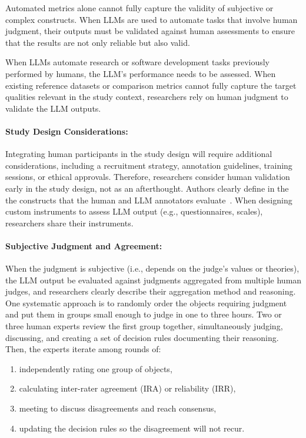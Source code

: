 
Automated metrics alone cannot fully capture the validity of subjective or complex constructs.
When LLMs are used to automate tasks that involve human judgment, their outputs must be validated against human assessments to ensure that the results are not only reliable but also valid.


When LLMs automate research or software development tasks previously performed by humans, the LLM's performance needs to be assessed. When existing reference datasets or comparison metrics cannot fully capture the target qualities relevant in the study context, researchers \should rely on human judgment to validate the LLM outputs.

\paragraph{Study Design Considerations:}
Integrating human participants in the study design will require additional considerations, including a recruitment strategy, annotation guidelines, training sessions, or ethical approvals.
Therefore, researchers \should consider human validation early in the study design, not as an afterthought.
Authors \must clearly define in the \paper the constructs that the human and LLM annotators evaluate~\cite{DBLP:conf/ease/RalphT18}.
When designing custom instruments to assess LLM output (e.g., questionnaires, scales), researchers \must share their instruments.

\paragraph{Subjective Judgment and Agreement:}
When the judgment is subjective (i.e., depends on the judge's values or theories), the LLM output \should be evaluated against judgments aggregated from multiple human judges, and researchers \should clearly describe their aggregation method and reasoning. One systematic approach is to randomly order the objects requiring judgment and put them in groups small enough to judge in one to three hours. Two or three human experts review the first group together, simultaneously judging, discussing, and creating a set of decision rules documenting their reasoning. Then, the experts iterate among rounds of:
\begin{enumerate}
    \item independently rating one group of objects,
    \item calculating inter-rater agreement (IRA) or reliability (IRR),
    \item meeting to discuss disagreements and reach consensus,
    \item updating the decision rules so the disagreement will not recur.
\end{enumerate}

